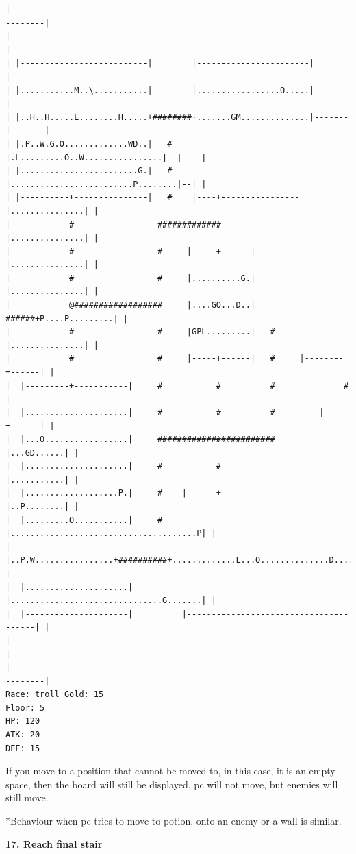 \documentclass[11pt]{article}
\theoremstyle{plain}
\begin{document}
\begin{Verbatim}[fontsize=\scriptsize]
|-----------------------------------------------------------------------------|
|                                                                             |
| |--------------------------|        |-----------------------|               |
| |...........M..\...........|        |.................O.....|               |
| |..H..H.....E........H.....+########+.......GM..............|-------|       |
| |.P..W.G.O.............WD..|   #    |.L.........O..W................|--|    |
| |........................G.|   #    |.........................P........|--| |
| |----------+---------------|   #    |----+----------------|...............| |
|            #                 #############                |...............| |
|            #                 #     |-----+------|         |...............| |
|            #                 #     |..........G.|         |...............| |
|            @##################     |....GO...D..|   ######+P....P.........| |
|            #                 #     |GPL.........|   #     |...............| |
|            #                 #     |-----+------|   #     |--------+------| |
|  |---------+-----------|     #           #          #              #        |
|  |.....................|     #           #          #         |----+------| |
|  |...O.................|     ########################         |...GD......| |
|  |.....................|     #           #                    |...........| |
|  |...................P.|     #    |------+--------------------|..P........| |
|  |.........O...........|     #    |......................................P| |
|  |..P.W................+##########+.............L...O..............D......| |
|  |.....................|          |...............................G.......| |
|  |---------------------|          |---------------------------------------| |
|                                                                             |
|-----------------------------------------------------------------------------|
Race: troll Gold: 15                                                   Floor: 5
HP: 120
ATK: 20
DEF: 15
\end{Verbatim}

If you move to a position that cannot be moved to, in this case, it is an
empty space, then the board will still be displayed, pc will not move, 
but enemies will still move.

*Behaviour when pc tries to move to potion, onto an enemy or a wall is
similar.



\newpage
\textbf{17. Reach final stair}
\end{document}
